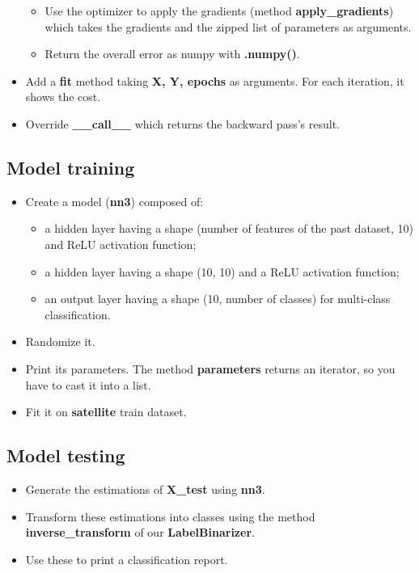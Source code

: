 \documentclass[11pt, a4paper]{article}
\begin{document}
\begin{multicols}{2}
\begin{itemize}
\begin{itemize}
			\item Use the optimizer to apply the gradients (method \textbf{apply\_gradients}) which takes the gradients and the zipped list of parameters as arguments. 
			\item Return the overall error as numpy with \textbf{.numpy()}. 
		\end{itemize}
		\item Add a \textbf{fit} method taking \textbf{X, Y, epochs} as arguments.
		For each iteration, it shows the cost.
		\item Override \textbf{\_\_call\_\_} which returns the backward pass's result. 
	\end{itemize}
	
	\subsection{Model training} 
	
	\begin{itemize}  
		\item Create a model (\textbf{nn3}) composed of:
		\begin{itemize} 
			\item a hidden layer having a shape (number of features of the past dataset, 10) and ReLU activation function;
			\item a hidden layer having a shape (10, 10) and a ReLU activation function;
			\item an output layer having a shape (10, number of classes) for multi-class classification.
		\end{itemize}
		\item Randomize it.
		\item Print its parameters. The method \textbf{parameters} returns an iterator, so you have to cast it into a list.
		\item Fit it on \textbf{satellite} train dataset.
	\end{itemize}
	
	\subsection{Model testing} 
	
	\begin{itemize}  
		\item Generate the estimations of \textbf{X\_test} using \textbf{nn3}.
		\item Transform these estimations into classes using the method \textbf{inverse\_transform} of our \textbf{LabelBinarizer}.
		\item Use these to print a classification report.
	\end{itemize}

\end{multicols}
\end{document}
